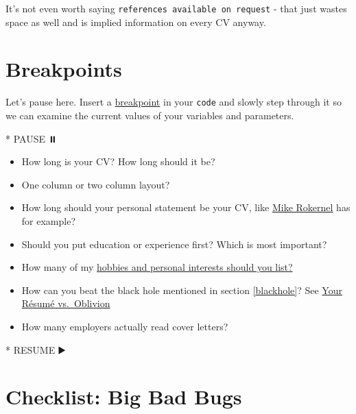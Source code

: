 \documentclass[
]{book}
\newenvironment{Shaded}{\begin{snugshade}}{\end{snugshade}}
\newcommand{\NormalTok}[1]{#1}
\newcommand{\SpecialStringTok}[1]{\textcolor[rgb]{0.31,0.60,0.02}{#1}}
\providecommand{\tightlist}{%
  \setlength{\itemsep}{0pt}\setlength{\parskip}{0pt}}
\begin{document}
It's not even worth saying \texttt{references\ available\ on\ request} - that just wastes space as well and is implied information on every CV anyway.

\hypertarget{bp7}{%
\section{Breakpoints}\label{bp7}}

Let's pause here. Insert a \href{https://en.wikipedia.org/wiki/Breakpoint}{breakpoint} in your \texttt{code} and slowly step through it so we can examine the current values of your variables and parameters.

\begin{Shaded}
\begin{Highlighting}[]
\SpecialStringTok{* }\NormalTok{PAUSE ⏸️}
\end{Highlighting}
\end{Shaded}

\begin{itemize}
\tightlist
\item
  How long is your CV? How long should it be?
\item
  One column or two column layout?
\item
  How long should your personal statement be your CV, like \href{https://www.cdyf.me/Mike_Rokernel.pdf}{Mike Rokernel} has for example?
\item
  Should you put education or experience first? Which is most important?
\item
  How many of my \href{https://www.reed.co.uk/career-advice/hobbies-and-interests-should-i-include-them-in-my-cv}{hobbies and personal interests should you list?} \citep{hobbies}
\item
  How can you beat the black hole mentioned in section \ref{blackhole}? See \href{https://www.wsj.com/articles/SB10001424052970204624204577178941034941330}{Your Résumé vs.~Oblivion} \citep{oblivion}
\item
  How many employers actually read cover letters?
\end{itemize}

\begin{Shaded}
\begin{Highlighting}[]
\SpecialStringTok{* }\NormalTok{RESUME ▶️}
\end{Highlighting}
\end{Shaded}

\hypertarget{checklist}{%
\section{Checklist: Big Bad Bugs}\label{checklist}}
\end{document}
